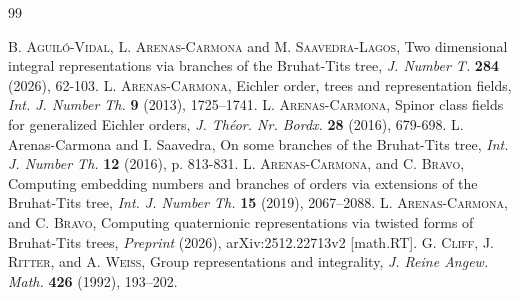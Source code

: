 \documentclass{article}
\theoremstyle{definition}
\begin{document}
\begin{thebibliography}{99}

    \textsc{B. Aguiló-Vidal}, \textsc{L. Arenas-Carmona} and 
    \textsc{M. Saavedra-Lagos}, Two dimensional integral representations 
    via branches of the Bruhat-Tits tree, \textit{J. Number T.} \textbf{284}
    (2026), 62-103. 
     \textsc{L. Arenas-Carmona}, Eichler order, trees and representation 
     fields, \textit{Int. J. Number Th.} \textbf{9} (2013), 1725–1741.
     \textsc{L. Arenas-Carmona}, Spinor class fields for generalized 
     Eichler orders, \textit{J. Th\'eor. Nr. Bordx.} 
     \textbf{28} (2016),  679-698.
     {\sc L. Arenas-Carmona} and {\sc I. Saavedra}, 
     On some branches of the Bruhat-Tits tree,  
     {\em Int. J. Number Th.} \textbf{12} (2016), p. 813-831.
    \textsc{L. Arenas-Carmona}, and \textsc{C. Bravo}, Computing 
    embedding numbers and branches of orders via extensions of the
    Bruhat-Tits tree, \textit{Int. J. Number Th.} \textbf{15} (2019), 
    2067–2088.
    \textsc{L. Arenas-Carmona}, and \textsc{C. Bravo},
    Computing quaternionic representations via twisted forms of Bruhat-Tits trees,
    \textit{Preprint} (2026), arXiv:2512.22713v2 [math.RT].
    \textsc{G. Cliff}, \textsc{J. Ritter}, and \textsc{A. Weiss}, 
    Group representations and integrality, \textit{J. Reine Angew. Math.} 
    \textbf{426} (1992), 193–202.

\end{thebibliography}
\end{document}
